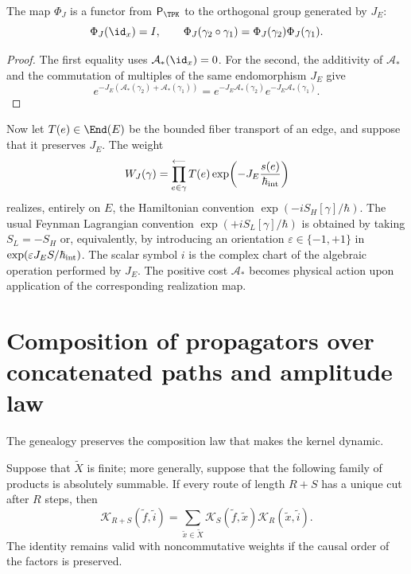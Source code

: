 \begin{proposition}
\label{prop:multiplicatividad-fase-interna}
The map \(\Phi_J\) is a functor from \(\mathsf P_{\TPK}\) to the orthogonal
group generated by \(J_E\):
\[
 \Phi_J(\id_x)=I,
 \qquad
 \Phi_J(\gamma_2\circ\gamma_1)
 =\Phi_J(\gamma_2)\Phi_J(\gamma_1).
\]
\end{proposition}

\begin{proof}
The first equality uses \(\mathcal A_*(\id_x)=0\). For the second, the
additivity of \(\mathcal A_*\) and the commutation of multiples of the same
endomorphism \(J_E\) give
\[
 e^{-J_E(\mathcal A_*(\gamma_2)+\mathcal A_*(\gamma_1))}
 =e^{-J_E\mathcal A_*(\gamma_2)}
  e^{-J_E\mathcal A_*(\gamma_1)}.
\]
\end{proof}

Now let \(T(e)\in\End(E)\) be the bounded fiber transport of an edge, and
suppose
that it preserves \(J_E\). The weight
\[
 W_J(\gamma)
 =\prod_{e\in\gamma}^{\longleftarrow}
   T(e)\exp\!\left(-J_E\frac{s(e)}{\hbar_{\rm int}}\right)
\]
realizes, entirely on \(E\), the Hamiltonian convention \(\exp(-iS_H[\gamma]/\hbar)\). The usual Feynman Lagrangian convention \(\exp(+iS_L[\gamma]/\hbar)\) is obtained by taking \(S_L=-S_H\) or, equivalently, by introducing an orientation \(\varepsilon\in\{-1,+1\}\) in \(\exp(\varepsilon J_ES/\hbar_{\rm int})\). The scalar symbol \(i\) is the complex chart of the algebraic operation performed by \(J_E\). The positive cost \(\mathcal A_*\) becomes physical action upon application of the corresponding realization map.

\section{Composition of propagators over concatenated paths and amplitude law}

The genealogy preserves the composition law that makes the kernel dynamic.

\begin{proposition}
\label{prop:chapman-kolmogorov-genealogico}
Suppose that \(\widetilde X\) is finite; more generally, suppose that the following family of
products is absolutely summable. If every route of length
\(R+S\) has a unique cut after \(R\) steps, then
\begin{equation}
 \mathcal K_{R+S}(\widetilde f,\widetilde i)
 =\sum_{\widetilde x\in\widetilde X}
   \mathcal K_S(\widetilde f,\widetilde x)
   \mathcal K_R(\widetilde x,\widetilde i).
 \label{eq:convolucion-kernel}
\end{equation}
The identity remains valid with noncommutative weights if the causal order of the factors is preserved.
\end{proposition}

